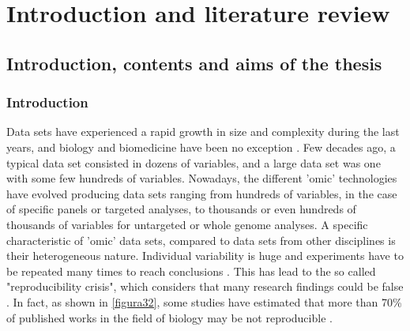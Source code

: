 \part{Introduction and literature review}
\chapter[Introduction, contents and aims of the thesis]{Introduction, contents and aims of the thesis}



\section{Introduction}
\label{sec:Intro}
Data sets have experienced a rapid growth in size and complexity during the last years, and biology and biomedicine have been no exception \parencite{marx2013biology, costa2014big}. Few decades ago, a typical data set consisted in dozens of variables, and a large data set was one with some few hundreds of variables. Nowadays, the different 'omic' technologies have evolved producing data sets ranging from hundreds of variables, in the case of specific panels or targeted analyses, to thousands or even hundreds of thousands of variables for untargeted or whole genome analyses. A specific characteristic of 'omic' data sets, compared to data sets from other disciplines is their heterogeneous nature. Individual variability is huge and experiments have to be repeated many times to reach conclusions \parencite{lay2006problems}. This has lead to the so called "reproducibility crisis", which considers that many research findings could be false \parencite{ioannidis2005most, begley2015reproducibility}. In fact, as shown in \autoref{figura32}, some studies have estimated that more than 70\% of published works in the field of biology may be not reproducible \parencite{baker20161}.

